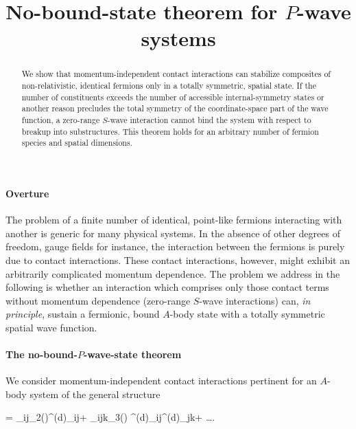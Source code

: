 \documentclass[aps,prd,twocolumn,tightenlines,letterpaper,nofootinbib]{revtex4-1}
\begin{document}
\title{No-bound-state theorem for $P$-wave systems} 

\begin{abstract}
We show that momentum-independent contact interactions can
stabilize composites of non-relativistic, identical fermions 
only in a totally symmetric, spatial state.
If the number of constituents exceeds the
number of accessible internal-symmetry states or another
reason precludes the total symmetry of the coordinate-space part of the
wave function, a zero-range $S$-wave interaction cannot bind
the system with respect to breakup into substructures.
This theorem holds for an arbitrary number of fermion species and spatial
dimensions. 
\end{abstract}
 
\maketitle

\paragraph{Overture}

The problem of a finite number of identical, point-like fermions
interacting with another is generic for many physical systems.
In the absence of other degrees of freedom, gauge fields for instance, the 
interaction between the fermions is purely due to
contact interactions. These contact interactions, however,
might exhibit an arbitrarily complicated momentum
dependence. The problem we address in the following is whether an 
interaction which comprises only those contact terms
without momentum dependence (zero-range $S$-wave interactions) can,
{\it in principle}, sustain a fermionic, bound $A$-body state with a
totally symmetric spatial wave function.

\paragraph{The no-bound-$P$-wave-state theorem}

We consider momentum-independent contact interactions pertinent for an
$A$-body system of the general structure

\be{}
=
\sum_{i\neq j\atop {}}_2()\delta^{(d)}_{ij}+
\sum_{i\neq j\neq k\atop {}}_3()
\delta^{(d)}_{ij}\delta^{(d)}_{jk}+
\ldots\;\;\;\;\;.
\ee
\end{document}
